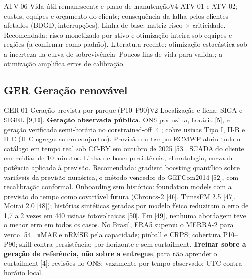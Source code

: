 \begin{ficha}{ATV-06 \textperiodcentered{} Vida útil remanescente e plano de manutenção}{V4}
 ATV-01 e ATV-02; custos, equipes e orçamento do cliente;
consequência da falha pelos clientes afetados (BDGD, interrupções).
 Linha de base: matriz risco × criticidade. Recomendada:
risco monetizado por ativo e otimização inteira sob equipes e regiões (a
confirmar como padrão). Literatura recente: otimização estocástica sob a
incerteza da curva de sobrevivência.
 Poucos fins de vida para validar; a otimização amplifica
erros de calibração.
\end{ficha}

\subsection{GER \textperiodcentered{} Geração renovável}

\begin{ficha}{GER-01 \textperiodcentered{} Geração prevista por parque (P10--P90)}{V2}
 Localização e ficha: SIGA e SIGEL [9,10]. \textbf{Geração
observada pública}: ONS por usina, horária [5], e geração verificada
semi-horária no constrained-off [4]; cobre usinas Tipo I, II-B e II-C (II-C
agregadas em conjuntos). Previsão do tempo: ECMWF abriu todo o catálogo em
tempo real sob CC-BY em outubro de 2025 [53]. SCADA do cliente em médias de
10 minutos.
 Linha de base: persistência, climatologia, curva de
potência aplicada à previsão. Recomendada: gradient boosting quantílico sobre
variáveis da previsão numérica, o método vencedor do GEFCom2014 [52], com
recalibração conformal. Onboarding sem histórico: foundation models com a
previsão do tempo como covariável futura (Chronos-2 [46], TimesFM 2.5 [47],
Moirai 2.0 [48]); histórias sintéticas geradas por modelo físico reduziram o
erro de 1,7 a 2 vezes em 440 usinas fotovoltaicas [50]. Em [49], nenhuma
abordagem teve o menor erro em todos os casos. No Brasil, ERA5 superou o MERRA-2 para vento [54].
 nMAE e nRMSE pela capacidade; pinball e CRPS; cobertura
P10--P90; skill contra persistência; por horizonte e sem curtailment.
 \textbf{Treinar sobre a geração de referência, não sobre a
entregue}, para não aprender o curtailment [4]; revisões do ONS; vazamento
por tempo observado; UTC contra horário local.
\end{ficha}

